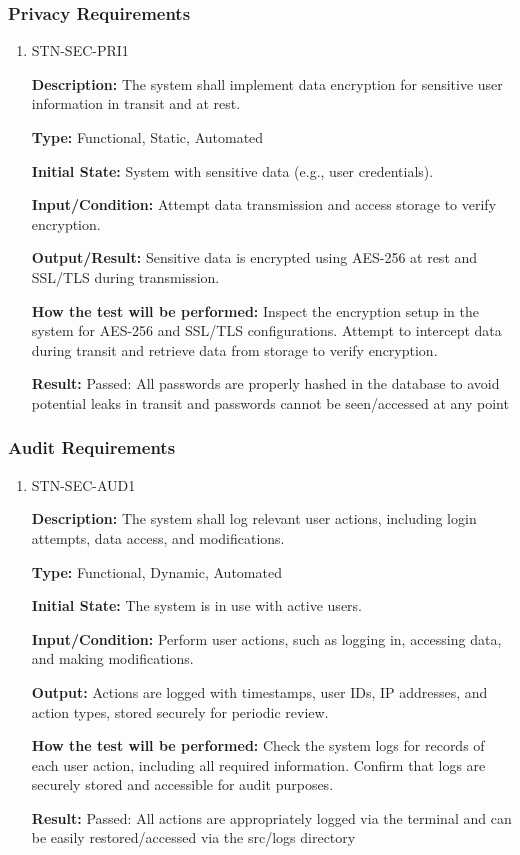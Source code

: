 \documentclass[12pt, titlepage]{article}
\begin{document}
\subsubsection{Privacy Requirements}

\begin{enumerate}

\item{STN-SEC-PRI1\\}

\textbf{Description:} The system shall implement data encryption for sensitive user information in transit and at rest.

\textbf{Type:} Functional, Static, Automated

\textbf{Initial State:} System with sensitive data (e.g., user credentials).

\textbf{Input/Condition:} Attempt data transmission and access storage to verify encryption.

\textbf{Output/Result:} Sensitive data is encrypted using AES-256 at rest and SSL/TLS during transmission.

\textbf{How the test will be performed:} Inspect the encryption setup in the system for AES-256 and SSL/TLS configurations. Attempt to intercept data during transit and retrieve data from storage to verify encryption.

\textbf{Result:} Passed: All passwords are properly hashed in the database to avoid potential leaks in transit and passwords cannot be seen/accessed at any point

\end{enumerate}

\subsubsection{Audit Requirements}

\begin{enumerate}

\item{STN-SEC-AUD1\\}

\textbf{Description:} The system shall log relevant user actions, including login attempts, data access, and modifications.

\textbf{Type:} Functional, Dynamic, Automated

\textbf{Initial State:} The system is in use with active users.

\textbf{Input/Condition:} Perform user actions, such as logging in, accessing data, and making modifications.

\textbf{Output:} Actions are logged with timestamps, user IDs, IP addresses, and action types, stored securely for periodic review.

\textbf{How the test will be performed:} Check the system logs for records of each user action, including all required information. Confirm that logs are securely stored and accessible for audit purposes.

\textbf{Result:} Passed: All actions are appropriately logged via the terminal and can be easily restored/accessed via the src/logs directory

\end{enumerate}
\end{document}
